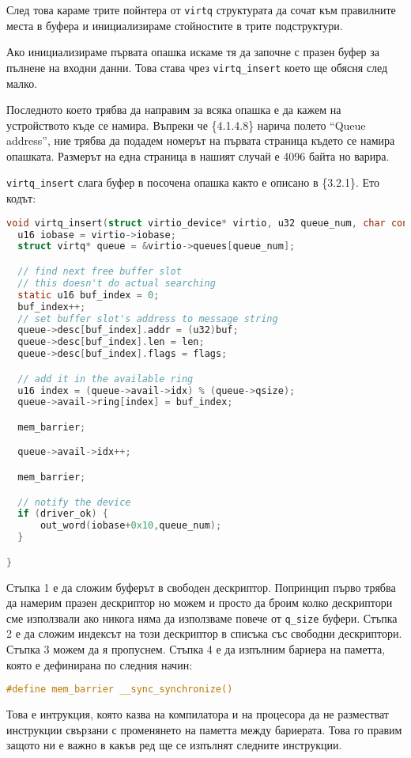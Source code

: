 След това караме трите пойнтера от {\tt virtq} структурата да сочат към правилните места в буфера и инициализираме стойностите в трите подструктури.

Ако инициализираме първата опашка искаме тя да започне с празен буфер за пълнене на входни данни. Това става чрез {\tt virtq\_insert} което ще обясня след малко.

Последното което трябва да направим за всяка опашка е да кажем на устройството къде се намира. Въпреки че \{4.1.4.8\} нарича полето ``Queue address'', ние трябва да подадем номерът на първата страница където се намира опашката. Размерът на една страница в нашият случай е 4096 байта но варира.

{\tt virtq\_insert} слага буфер в посочена опашка както е описано в \{3.2.1\}. Ето кодът:
\begin{lstlisting}[language=C]
void virtq_insert(struct virtio_device* virtio, u32 queue_num, char const* buf, u32 len, u8 flags) {
  u16 iobase = virtio->iobase;
  struct virtq* queue = &virtio->queues[queue_num];

  // find next free buffer slot
  // this doesn't do actual searching
  static u16 buf_index = 0;
  buf_index++;
  // set buffer slot's address to message string
  queue->desc[buf_index].addr = (u32)buf;
  queue->desc[buf_index].len = len;
  queue->desc[buf_index].flags = flags;

  // add it in the available ring
  u16 index = (queue->avail->idx) % (queue->qsize);
  queue->avail->ring[index] = buf_index;

  mem_barrier;

  queue->avail->idx++;

  mem_barrier;

  // notify the device
  if (driver_ok) {
      out_word(iobase+0x10,queue_num);
  }

}
\end{lstlisting}
Стъпка 1 е да сложим буферът в свободен дескриптор. Попринцип първо трябва да намерим празен дескриптор но можем и просто да броим колко дескриптори сме използвали ако никога няма да използваме повече от {\tt q\_size} буфери. Стъпка 2 е да сложим индексът на този дескриптор в списъка със свободни дескриптори. Стъпка 3 можем да я пропуснем. Стъпка 4 е да изпълним бариера на паметта, която е дефинирана по следния начин:
\begin{lstlisting}[language=C]
#define mem_barrier __sync_synchronize()
\end{lstlisting}
Това е интрукция, която казва на компилатора и на процесора да не разместват инструкции свързани с променянето на паметта между бариерата. Това го правим защото ни е важно в какъв ред ще се изпълнят следните инструкции.

